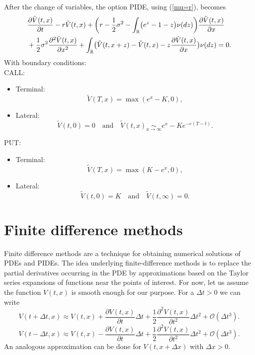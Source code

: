 After the change of variables, the option PIDE, using (\ref{mu=r}), becomes 
\begin{align}\label{PIDE_log}
&  \frac{\partial \tilde V(t,x)}{\partial t} - r \tilde V(t,x) 
          + \biggl( r -\frac{1}{2}\sigma^2 - \int_{\mathbb{R}} \bigl( e^z-1-z \bigr) \nu(dz) \biggr) \frac{\partial \tilde V(t,x)}{\partial x} \\ \nonumber
          &+ \frac{1}{2} \sigma^2 \frac{\partial^2 \tilde V(t,x)}{\partial x^2} 
          + \int_{\mathbb{R}} \bigl( \tilde V(t,x+z)- \tilde V(t,x) - z \frac{\partial \tilde V(t,x)}{\partial x} \bigr) \nu(dz)  = 0.
\end{align}
With boundary conditions:\\
CALL:
\begin{itemize}
 \item Terminal:
 $$ \tilde V(T,x) = \max(e^x-K,0), $$
 \item Lateral:
 $$ \tilde V(t,0) = 0 \quad \mbox{and} \quad \tilde V(t, x) \underset{x \to \infty}{\sim} e^x - Ke^{-e(T-t)}. $$
\end{itemize}
PUT:
\begin{itemize}
 \item Terminal:
 $$ \tilde V(T,x) = \max(K-e^x,0), $$
 \item Lateral:
 $$ \tilde V(t,0) = K \quad \mbox{and} \quad \tilde V(t, \infty) = 0. $$
\end{itemize}


\section{Finite difference methods}

Finite difference methods are a technique for obtaining numerical solutions of PDEs and PIDEs. 
The idea underlying finite-difference methods is to replace the partial derivatives occurring in the PDE by approximations based on the Taylor series 
expansions of functions near the points of interest.
For now, let us assume the function $V(t,x)$ is smooth enough for our purpose. For a $\Delta t > 0$ we can write
\begin{equation}
 V(t+\Delta t,x) \approx V(t,x) + \frac{\partial V(t,x)}{\partial t} \Delta t + \frac{1}{2} \frac{\partial^2 V(t,x)}{\partial t^2} \Delta t^2 + \mathcal{O}(\Delta t^3).
\end{equation}
\begin{equation}
 V(t-\Delta t,x) \approx V(t,x) - \frac{\partial V(t,x)}{\partial t} \Delta t + \frac{1}{2} \frac{\partial^2 V(t,x)}{\partial t^2} \Delta t^2 + \mathcal{O}(\Delta t^3).
\end{equation}
An analogous approximation can be done for $V(t,x+\Delta x)$ with $\Delta x > 0$.

